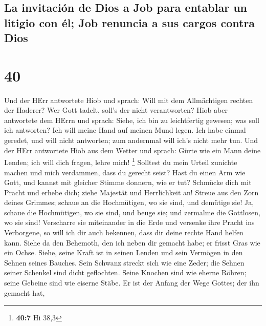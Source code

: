 \hypertarget{la-invitaciuxf3n-de-dios-a-job-para-entablar-un-litigio-con-uxe9l-job-renuncia-a-sus-cargos-contra-dios}{%
\subsection{La invitación de Dios a Job para entablar un litigio con él;
Job renuncia a sus cargos contra
Dios}\label{la-invitaciuxf3n-de-dios-a-job-para-entablar-un-litigio-con-uxe9l-job-renuncia-a-sus-cargos-contra-dios}}

\hypertarget{section-39}{%
\section{40}\label{section-39}}

 Und der HErr antwortete Hiob und sprach: 
Will mit dem Allmächtigen rechten der Haderer? Wer Gott tadelt, soll's
der nicht verantworten?  Hiob aber antwortete dem HErrn
und sprach:  Siehe, ich bin zu leichtfertig gewesen; was
soll ich antworten? Ich will meine Hand auf meinen Mund legen.
 Ich habe einmal geredet, und will nicht antworten; zum
andernmal will ich's nicht mehr tun.  Und der HErr
antwortete Hiob aus dem Wetter und sprach:  Gürte wie ein
Mann deine Lenden; ich will dich fragen, lehre mich! \footnote{\textbf{40:7}
  Hi 38,3}  Solltest du mein Urteil zunichte machen und
mich verdammen, dass du gerecht seist?  Hast du einen Arm
wie Gott, und kannst mit gleicher Stimme donnern, wie er tut?
 Schmücke dich mit Pracht und erhebe dich; ziehe Majestät
und Herrlichkeit an!  Streue aus den Zorn deines Grimmes;
schaue an die Hochmütigen, wo sie sind, und demütige sie!
 Ja, schaue die Hochmütigen, wo sie sind, und beuge sie;
und zermalme die Gottlosen, wo sie sind!  Verscharre sie
miteinander in die Erde und versenke ihre Pracht ins Verborgene,
 so will ich dir auch bekennen, dass dir deine rechte
Hand helfen kann.  Siehe da den Behemoth, den ich neben
dir gemacht habe; er frisst Gras wie ein Ochse.  Siehe,
seine Kraft ist in seinen Lenden und sein Vermögen in den Sehnen seines
Bauches.  Sein Schwanz streckt sich wie eine Zeder; die
Sehnen seiner Schenkel sind dicht geflochten.  Seine
Knochen sind wie eherne Röhren; seine Gebeine sind wie eiserne Stäbe.
 Er ist der Anfang der Wege Gottes; der ihn gemacht hat,
